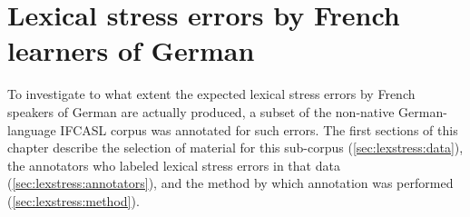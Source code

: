 %
%
\chapter{Lexical stress errors by French learners of German }
\label{chap:lexstress}



%	
	



	To investigate to what extent the expected lexical stress errors by French speakers of German are actually produced, a subset of the non-native German-language IFCASL corpus was annotated for such errors.
%
	The first sections of this chapter describe the selection of material for this sub-corpus (\cref{sec:lexstress:data}), the annotators who labeled lexical stress errors in that data (\cref{sec:lexstress:annotators}), and the method by which annotation was performed (\cref{sec:lexstress:method}). 
	
